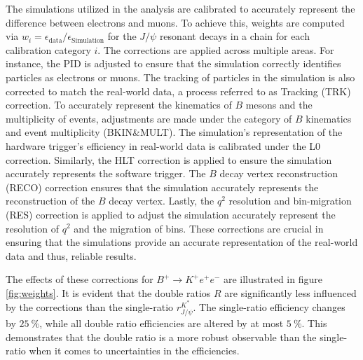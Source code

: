 The simulations utilized in the analysis are calibrated to accurately represent the difference 
between electrons and muons. To achieve this, weights are computed via 
$w_i=\epsilon_\text{data}/\epsilon_\text{Simulation}$ for the $J\!/\!\psi$ resonant decays in a chain 
for each calibration category $i$. 
The corrections are applied across multiple areas. For instance, the PID is adjusted to ensure 
that the simulation correctly identifies particles as electrons or muons. The tracking of 
particles in the simulation is also corrected to match the real-world data, a process referred 
to as Tracking (TRK) correction.
To accurately represent the kinematics of $B$ mesons and the multiplicity of events, adjustments 
are made under the category of $B$ kinematics and event multiplicity (BKIN\&MULT). The simulation's
representation of the hardware trigger's efficiency in real-world data is calibrated under the 
L0 correction.
Similarly, the HLT correction is applied to ensure the simulation accurately represents the software 
trigger. The $B$ decay vertex reconstruction (RECO) correction ensures that the simulation accurately 
represents the reconstruction of the $B$ decay vertex.
Lastly, the $q^2$ resolution and bin-migration (RES) correction is applied to adjust the simulation 
accurately represent the resolution of $q^2$ and the migration of bins. These corrections are crucial 
in ensuring that the simulations provide an accurate representation of the real-world data and thus, 
reliable results.

The effects of these corrections for $B^+\to K^+e^+e^-$ are illustrated in figure \ref{fig:weights}. 
It is evident that the double ratios $R$ are significantly less influenced by the corrections 
than the single-ratio $r^{K^*}_{J\!/\!\psi}$. The single-ratio efficiency changes by $\SI{25}{\%}$, 
while all double ratio efficiencies are altered by at most $\SI{5}{\%}$. This demonstrates that 
the double ratio is a more robust observable than the single-ratio when it comes to uncertainties 
in the efficiencies.

